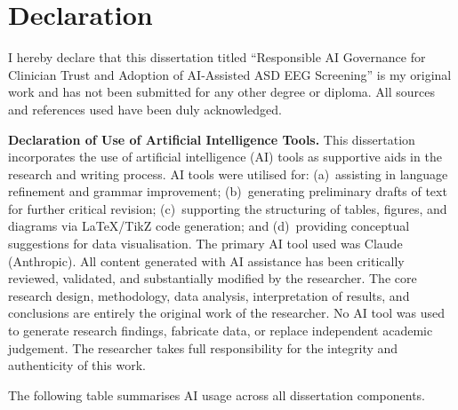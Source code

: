 \documentclass[12pt,a4paper,oneside]{report}
\newcommand{\thesistitle}{Responsible AI Governance for Clinician Trust and Adoption of AI-Assisted ASD EEG Screening}
\begin{document}
\chapter*{Declaration}

I hereby declare that this dissertation titled ``\thesistitle'' is my original work and has not been submitted for any other degree or diploma. All sources and references used have been duly acknowledged.

\vspace{1cm}

\noindent\textbf{Declaration of Use of Artificial Intelligence Tools.}
This dissertation incorporates the use of artificial intelligence (AI) tools as supportive aids in the research and writing process. AI tools were utilised for: (a)~assisting in language refinement and grammar improvement; (b)~generating preliminary drafts of text for further critical revision; (c)~supporting the structuring of tables, figures, and diagrams via LaTeX/TikZ code generation; and (d)~providing conceptual suggestions for data visualisation. The primary AI tool used was Claude (Anthropic). All content generated with AI assistance has been critically reviewed, validated, and substantially modified by the researcher. The core research design, methodology, data analysis, interpretation of results, and conclusions are entirely the original work of the researcher. No AI tool was used to generate research findings, fabricate data, or replace independent academic judgement. The researcher takes full responsibility for the integrity and authenticity of this work.

\vspace{0.5em}
\noindent The following table summarises AI usage across all dissertation components.
\end{document}
